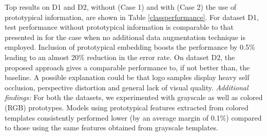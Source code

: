 \documentclass{bmvc2k}
\begin{document}
Top results on D1 and D2, without (Case 1) and with (Case 2) the use of
prototypical information, are shown in Table \ref{classperformance}. For dataset D1, test performance 
without prototypical information is comparable to that presented in
\cite{multicolumnarDNN} for the case when no additional data augmentation technique is employed. Inclusion
of prototypical embedding boosts the performance by 0.5\% leading
to an almost 20\% reduction in the error rate. On dataset D2, the proposed
approach gives a comparable performance to, if not better than, the
baseline.
A possible explanation could be that logo samples display heavy self
occlusion, perspective distortion and general lack of visual quality.
\iffalse
Our understanding is that a
deeper CNN with a greater adaptability to the above variations should give a
higher performance boost while attempting to match the samples to the
prototypes in the embedding space.
\fi\textit{Additional findings:} For both the datasets, we experimented with
grayscale as well as colored (RGB) prototypes. Models using prototypical features extracted from 
colored templates consistently performed lower (by an average margin of 0.1\%)
compared to those using the same features obtained from grayscale templates. 
\end{document}
